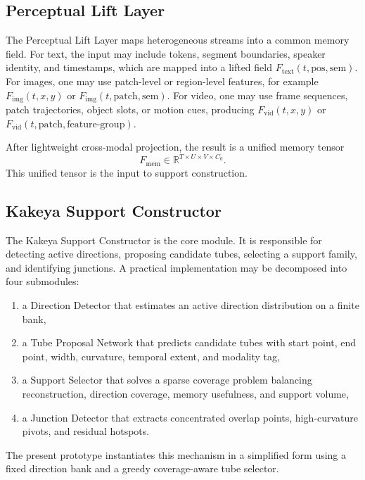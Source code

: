 \documentclass[11pt]{article}
\begin{document}
\subsection{Perceptual Lift Layer}
The Perceptual Lift Layer maps heterogeneous streams into a common memory field. For text, the input may include tokens, segment boundaries, speaker identity, and timestamps, which are mapped into a lifted field $F_{\mathrm{text}}(t,\mathrm{pos},\mathrm{sem})$. For images, one may use patch-level or region-level features, for example $F_{\mathrm{img}}(t,x,y)$ or $F_{\mathrm{img}}(t,\mathrm{patch},\mathrm{sem})$. For video, one may use frame sequences, patch trajectories, object slots, or motion cues, producing $F_{\mathrm{vid}}(t,x,y)$ or $F_{\mathrm{vid}}(t,\mathrm{patch},\mathrm{feature\text{-}group})$.

After lightweight cross-modal projection, the result is a unified memory tensor
\begin{equation}
F_{\mathrm{mem}} \in \mathbb{R}^{T\times U\times V\times C_0}.
\end{equation}
This unified tensor is the input to support construction.

\subsection{Kakeya Support Constructor}
The Kakeya Support Constructor is the core module. It is responsible for detecting active directions, proposing candidate tubes, selecting a support family, and identifying junctions. A practical implementation may be decomposed into four submodules:
\begin{enumerate}[leftmargin=1.5em]
\item a Direction Detector that estimates an active direction distribution on a finite bank,
\item a Tube Proposal Network that predicts candidate tubes with start point, end point, width, curvature, temporal extent, and modality tag,
\item a Support Selector that solves a sparse coverage problem balancing reconstruction, direction coverage, memory usefulness, and support volume,
\item a Junction Detector that extracts concentrated overlap points, high-curvature pivots, and residual hotspots.
\end{enumerate}
The present prototype instantiates this mechanism in a simplified form using a fixed direction bank and a greedy coverage-aware tube selector.
\end{document}
